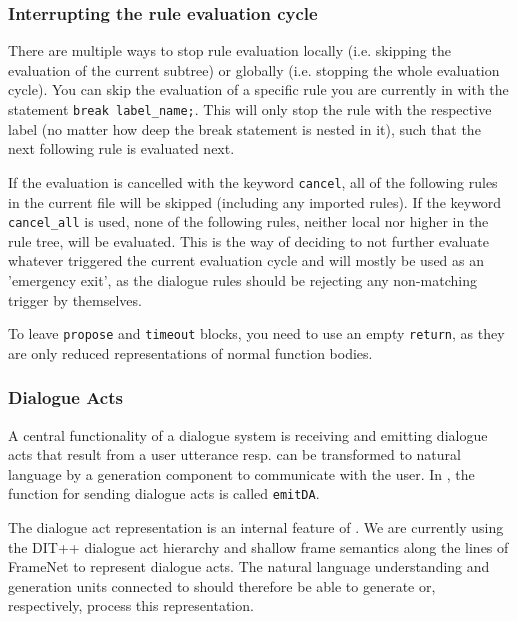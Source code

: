 \subsubsection{Interrupting the rule evaluation cycle}

There are multiple ways to stop rule evaluation locally (i.e. skipping the
evaluation of the current subtree) or globally (i.e. stopping the whole
evaluation cycle).
You can skip the evaluation of a specific rule you are currently in with the
statement \texttt{break label\_name;}. This will only stop the rule with the
respective label (no matter how deep the break statement is nested in it), such
that the next following rule is evaluated next.

If the evaluation is cancelled with the keyword \texttt{cancel}, all of the
following rules in the current file will be skipped (including any imported
rules). If the keyword \texttt{cancel\_all} is used, none of the following
rules, neither local nor higher in the rule tree, will be evaluated. This is
the \vonda way of deciding to not further evaluate whatever triggered the
current evaluation cycle and will mostly be used as an 'emergency exit', as the
dialogue rules should be rejecting any non-matching trigger by themselves.

To leave \texttt{propose} and \texttt{timeout} blocks, you need to use an empty
\texttt{return}, as they are only reduced representations of normal function
bodies.


\subsubsection{Dialogue Acts}
\label{sec:caret}

A central functionality of a dialogue system is receiving and emitting dialogue
acts that result from a user utterance resp. can be transformed to natural
language by a generation component to communicate with the user. In \vonda,
the function for sending dialogue acts is called \texttt{emitDA}.

The dialogue act representation is an internal feature of \vonda. We are
currently using the DIT++ dialogue act hierarchy \citep{bunt2012iso} and
shallow frame semantics along the lines of FrameNet
\citep{ruppenhofer2016framenet} to represent dialogue acts. The natural
language understanding and generation units connected to \vonda should
therefore be able to generate or, respectively, process this representation.

